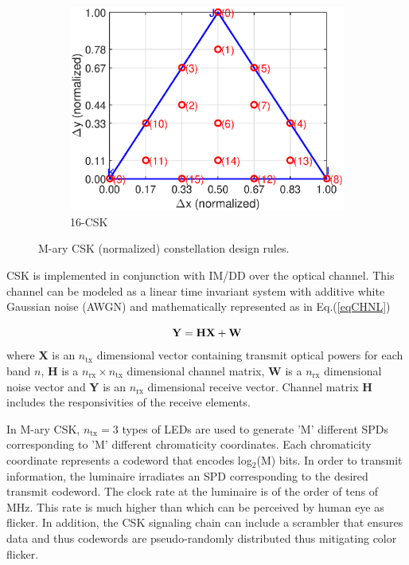 \documentclass[10pt,letterpaper]{article}
\newcommand{\vm}[1]{{\bf{#1}}}
\begin{document}
\begin{figure}[b]
\begin{subfigure}{0.32\textwidth}
			\includegraphics[trim={0.05in 0.0in 0.25in 0.2in}, clip=true, width=\textwidth]{CBCrules16.eps}
			\caption{16-CSK}
			\label{fig16Const}
		\end{subfigure}
	\caption{M-ary CSK (normalized) constellation design rules.}
	\label{figConst}
\end{figure}

CSK is implemented in conjunction with IM/DD over the optical channel. This channel can be modeled as a linear time invariant system with additive white Gaussian noise (AWGN) and mathematically represented as in Eq.(\ref{eqCHNL})

\begin{equation}
	\vm{Y} = \vm{H}\vm{X} + \vm{W}
	\label{eqCHNL}
\end{equation}
where \vm{X} is an $n_{\text{tx}}$ dimensional vector containing transmit optical powers for each band $n$, \vm{H} is a $n_{\text{rx}}\times n_{\text{tx}}$ dimensional channel matrix, \vm{W} is a $n_{\text{rx}}$ dimensional noise vector and \vm{Y} is an $n_{\text{rx}}$ dimensional receive vector. Channel matrix \vm{H} includes the responsivities of the receive elements.

In M-ary CSK, $n_{\text{tx}}=3$ types of LEDs are used to generate 'M' different SPDs corresponding to 'M' different chromaticity coordinates. Each chromaticity coordinate represents a codeword that encodes log$^{ }_{2}$(M) bits. In order to transmit information, the luminaire irradiates an SPD corresponding to the desired transmit codeword. The clock rate at the luminaire is of the order of tens of MHz. This rate is much higher than which can be perceived by human eye as flicker. In addition, the CSK signaling chain can include a scrambler that ensures data and thus codewords are pseudo-randomly distributed thus mitigating color flicker.
\end{document}
